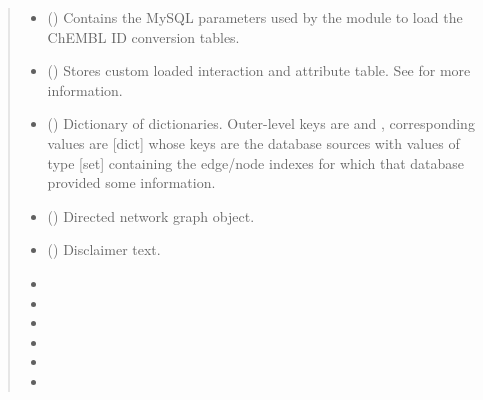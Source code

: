 \documentclass[letterpaper,10pt,english]{sphinxmanual}
\begin{document}
\begin{fulllineitems}
\begin{quote}
\begin{description}
\begin{itemize}
\item {} 
 () \textendash{} Contains the MySQL parameters used by the
 module to load the ChEMBL ID conversion
tables.

\item {} 
 () \textendash{} Stores custom loaded interaction and attribute table. See
 for more information.

\item {} 
 () \textendash{} Dictionary of dictionaries. Outer-level keys are  and
, corresponding values are {[}dict{]} whose keys are the
database sources with values of type {[}set{]} containing the
edge/node indexes for which that database provided some
information.

\item {} 
 () \textendash{} Directed network graph object.

\item {} 
 () \textendash{} Disclaimer text.

\item {} 
 \textendash{} 

\item {} 
 \textendash{} 

\item {} 
 \textendash{} 

\item {} 
 \textendash{} 

\item {} 
 \textendash{} 

\item {} 
 \textendash{} 


\end{itemize}
\end{description}
\end{quote}
\end{fulllineitems}
\end{document}
